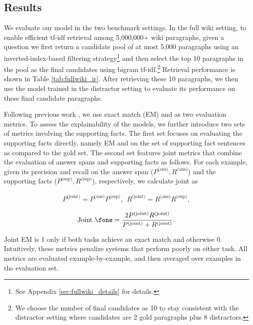 \subsection{Results}

We evaluate our model in the two benchmark settings. In the full wiki setting, to enable efficient tf-idf retrieval among 5,000,000+ wiki paragraphs, given a question we first return a candidate pool of at most 5,000 paragraphs using an inverted-index-based filtering strategy\footnote{See Appendix \ref{sec:fullwiki_details} for details.} and then select the top 10 paragraphs in the pool as the final candidates using bigram tf-idf.\footnote{We choose the number of final candidates as 10 to stay consistent with the distractor setting where candidates are 2 gold paragraphs plus 8 distractors.} Retrieval performance is shown in Table \ref{tab:fullwiki_ir}.
After retrieving these 10 paragraphs, we then use the model trained in the distractor setting to evaluate its performance on these final candidate paragraphs.

Following previous work \cite{rajpurkar2016squad}, we use exact match (EM) and \fone{} as two evaluation metrics. To assess the explainability of the models, we further introduce two sets of metrics involving the supporting facts. The first set focuses on evaluating the supporting facts directly, namely EM and \fone{} on the set of supporting fact sentences as compared to the gold set. The second set features joint metrics that combine the evaluation of answer spans and supporting facts as follows. For each example, given its precision and recall on the answer span ($P^{\text{(ans)}}, R^{\text{(ans)}}$) and the supporting facts ($P^{\text{(sup)}}, R^{\text{(sup)}}$), respectively, we calculate joint \fone{} as

\begin{align*}

P^{\text{(joint)}} = P^{\text{(ans)}}P^{\text{(sup)}}, ~~R^{\text{(joint)}} = R^{\text{(ans)}}R^{\text{(sup)}},
\end{align*}

\begin{align*}
\text{Joint \fone} = \frac{2 P^{\text{(joint)}} R^{\text{(joint)}}}{P^{\text{(joint)}} + R^{\text{(joint)}}}.
\end{align*}

Joint EM is 1 only if both tasks achieve an exact match and otherwise 0. Intuitively, these metrics penalize systems that perform poorly on either task. All metrics are evaluated example-by-example, and then averaged over examples in the evaluation set.

